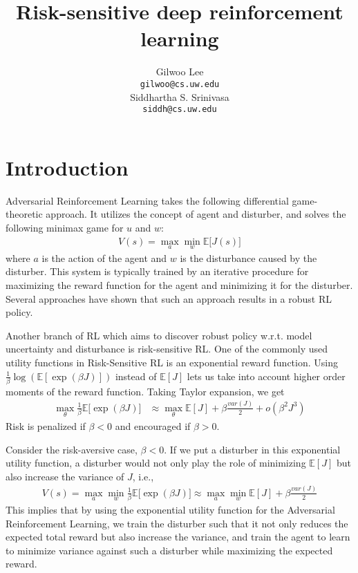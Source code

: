 \documentclass{article}
\title{Risk-sensitive deep reinforcement learning}
\author{Gilwoo Lee \\
  \texttt{gilwoo@cs.uw.edu} \\
  \And
  Siddhartha S. Srinivasa \\
  \texttt{siddh@cs.uw.edu}
}
\begin{document}
\maketitle

\section{Introduction}

Adversarial Reinforcement Learning takes the following differential game-theoretic approach. It utilizes the concept of agent and disturber, and solves the following minimax game for $u$ and $w$:
\begin{align*}
V(s) = \max_a \min_w \mathbb{E} \bigg[J(s)\bigg]
\end{align*}
where $a$ is the action of the agent and $w$ is the disturbance caused by the disturber. This system is typically trained by an iterative procedure for maximizing the reward function for the agent and minimizing it for the disturber. Several approaches\cite{morimoto2005robust, pinto2017robust, pattanaik2017robust} have shown that such an approach results in a robust RL policy.

Another branch of RL which aims to discover robust policy w.r.t. model uncertainty and disturbance is risk-sensitive RL. One of the commonly used utility functions in Risk-Sensitive RL is an exponential reward function. Using $\frac{1}{\beta}\log(\mathbb{E}[\exp(\beta J)])$ instead of $\mathbb{E}[J]$ lets us take into account higher order moments of the reward function. Taking Taylor expansion, we get
\begin{align*}
\max_\theta \frac{1}{\beta}\mathbb{E}\bigg[\exp(\beta J)\bigg]
 &\approx \max_\theta  \mathbb{E}[ J] + \beta \frac{var(J)}{2} + o(\beta^2J^3)
\end{align*}
Risk is penalized if $\beta< 0$ and encouraged if $\beta > 0$.

Consider the risk-aversive case, $\beta < 0$. If we put a disturber in this exponential utility function, a disturber would not only play the role of minimizing $\mathbb{E}[J]$ but also increase the variance of $J$, i.e.,
\begin{align*}
V(s) = \max_a \min_w \frac{1}{\beta}\mathbb{E} \bigg[\exp(\beta J)\bigg] \approx  \max_a \min_w \mathbb{E}[ J] + \beta \frac{var(J)}{2}
\end{align*}
This implies that by using the exponential utility function for the Adversarial Reinforcement Learning, we train the disturber such that it not only reduces the expected total reward but also increase the variance, and train the agent to learn to minimize variance against such a disturber while maximizing the expected reward.
\end{document}
